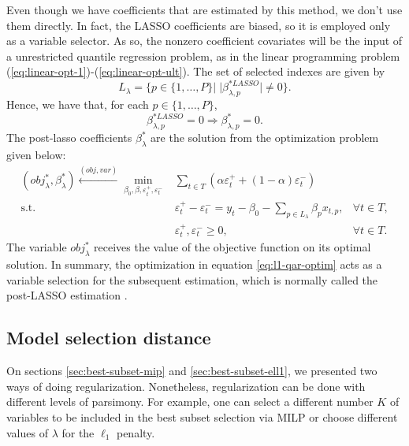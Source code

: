 Even though we have coefficients that are estimated by this method, we don't use them directly. In fact, the LASSO coefficients are biased, so it is employed only as a variable selector. As so, the nonzero coefficient covariates will be the input of a unrestricted quantile regression problem, as in the linear programming problem (\ref{eq:linear-opt-1})-(\ref{eq:linear-opt-ult}). 
The set of selected indexes are given by
\begin{equation*}
L_\lambda = \{ p \in \{ 1,\dots,P \} | \; |\beta^{*LASSO}_{\lambda,p}| \neq 0  \}.
\end{equation*}
Hence, we have that, for each $p \in \{ 1,\dots,P \}$,
$$\beta^{*LASSO}_{\lambda,p} = 0 \Longrightarrow \beta^{*}_{\lambda,p} = 0.$$
The post-lasso coefficients $\beta_\lambda^*$ are the solution from the optimization problem given below:
\begin{equation}
\begin{aligned} (obj_{\lambda}^{*},\beta_{\lambda}^{*})\overset{(obj,var)}{\longleftarrow} \min_{\beta_0,\beta,\varepsilon_{t}^{+},\varepsilon_{t}^{-}} & \sum_{t \in T}\left(\alpha\varepsilon_{t}^{+}+(1-\alpha)\varepsilon_{t}^{-}\right) \\
\mbox{s.t. } & \varepsilon_{t}^{+}-\varepsilon_{t}^{-}=y_{t} - \beta_0 - \sum_{p\in L_\lambda} \beta_p x_{t,p},& \forall t\in T,\\
& \varepsilon_t^+,\varepsilon_t^- \geq 0, & \forall t \in T.
\end{aligned}
\label{eq:post-lasso}
\end{equation}
The variable $obj_{\lambda}^{*}$ receives the value of the objective function on its optimal solution.
In summary, the optimization in equation \ref{eq:l1-qar-optim} acts as a variable selection for the subsequent estimation, which is normally called the post-LASSO estimation \cite{belloni2009least}.

\subsection{Model selection distance}

On sections \ref{sec:best-subset-mip} and \ref{sec:best-subset-ell1}, we presented two ways of doing regularization. Nonetheless, regularization can be done with different levels of parsimony. For example, one can select a different number $K$ of variables to be included in the best subset selection via MILP or choose different values of $\lambda$ for the $\ell_1$ penalty. 

